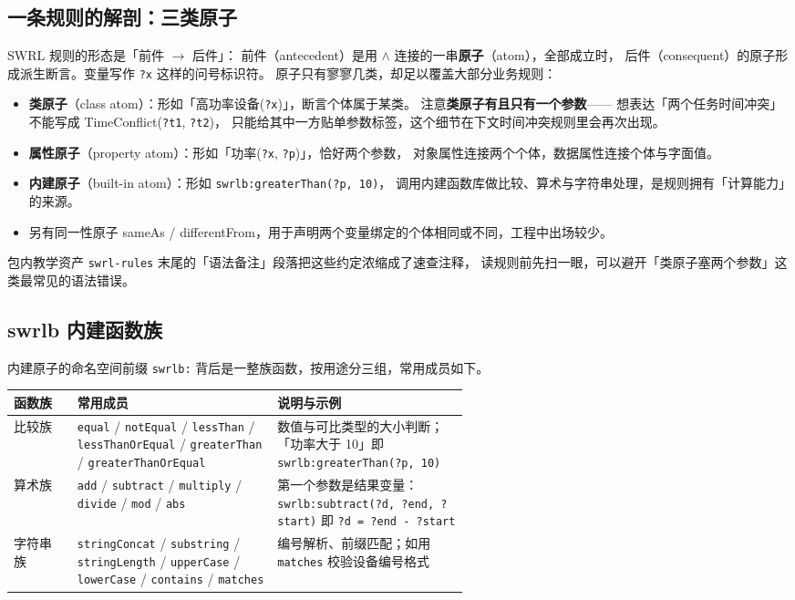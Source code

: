 \subsection{一条规则的解剖：三类原子}

SWRL 规则的形态是「前件 \(\rightarrow\) 后件」：
前件（antecedent）是用 \(\land\) 连接的一串\textbf{原子}（atom），全部成立时，
后件（consequent）的原子形成派生断言。变量写作 \texttt{?x} 这样的问号标识符。
原子只有寥寥几类，却足以覆盖大部分业务规则：

\begin{itemize}
\item \textbf{类原子}（class atom）：形如「高功率设备(\texttt{?x})」，断言个体属于某类。
  注意\textbf{类原子有且只有一个参数}——
  想表达「两个任务时间冲突」不能写成 TimeConflict(\texttt{?t1}, \texttt{?t2})，
  只能给其中一方贴单参数标签，这个细节在下文时间冲突规则里会再次出现。
\item \textbf{属性原子}（property atom）：形如「功率(\texttt{?x}, \texttt{?p})」，恰好两个参数，
  对象属性连接两个个体，数据属性连接个体与字面值。
\item \textbf{内建原子}（built-in atom）：形如 \texttt{swrlb:greaterThan(?p, 10)}，
  调用内建函数库做比较、算术与字符串处理，是规则拥有「计算能力」的来源。
\item 另有同一性原子 sameAs / differentFrom，用于声明两个变量绑定的个体相同或不同，工程中出场较少。
\end{itemize}

包内教学资产 \texttt{swrl-rules} 末尾的「语法备注」段落把这些约定浓缩成了速查注释，
读规则前先扫一眼，可以避开「类原子塞两个参数」这类最常见的语法错误。

\subsection{swrlb 内建函数族}

内建原子的命名空间前缀 \texttt{swrlb:} 背后是一整族函数，按用途分三组，常用成员如下。

\begin{center}
\begin{tabularx}{\linewidth}{@{}p{0.14\linewidth}p{0.44\linewidth}X@{}}
\toprule
\textbf{函数族} & \textbf{常用成员} & \textbf{说明与示例} \\
\midrule
比较族 & \texttt{equal} / \texttt{notEqual} / \texttt{lessThan} / \texttt{lessThanOrEqual} / \texttt{greaterThan} / \texttt{greaterThanOrEqual} & 数值与可比类型的大小判断；「功率大于 10」即 \texttt{swrlb:greaterThan(?p, 10)} \\
算术族 & \texttt{add} / \texttt{subtract} / \texttt{multiply} / \texttt{divide} / \texttt{mod} / \texttt{abs} & 第一个参数是结果变量：\texttt{swrlb:subtract(?d, ?end, ?start)} 即 \texttt{?d = ?end - ?start} \\
字符串族 & \texttt{stringConcat} / \texttt{substring} / \texttt{stringLength} / \texttt{upperCase} / \texttt{lowerCase} / \texttt{contains} / \texttt{matches} & 编号解析、前缀匹配；如用 \texttt{matches} 校验设备编号格式 \\
\bottomrule
\end{tabularx}
\end{center}

